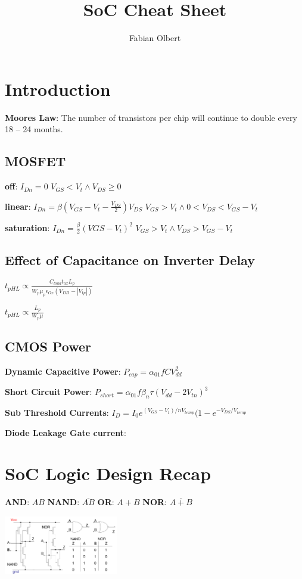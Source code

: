 \documentclass[english]{latex4ei/latex4ei_sheet}
\title{SoC Cheat Sheet}
\author{Fabian Olbert}					%
\begin{document}
\maketitle	%

\section{Introduction}

\textbf{Moores Law}: The number of transistors per chip will continue to double every 18 – 24 months.

\subsection{MOSFET}
\textbf{off}: \qquad $I_{Dn} = 0$ \qquad $V_{GS} < V_t \wedge V_{DS} \geq 0$

\textbf{linear}: \qquad $I_{Dn} = \beta (V_{GS} - V_t - \frac{V_{DS}}{2})V_{DS} $ \qquad $V_{GS} > V_t \wedge  0 < V_{DS} < V_{GS} - V_t$

\textbf{saturation}: \qquad $I_{Dn} = \frac{\beta}{2} (V{GS} - V_t)^2$ \qquad $V_{GS} > V_t \wedge  V_{DS} > V_{GS} - V_t$

\subsection{Effect of Capacitance on Inverter Delay}
$t_{pHL} \varpropto \frac{C_{load} t_{ox} L_p}{W_p \mu_p \epsilon_{Ox} (V_{DD} - |V_{tp}|)}$

$t_{pHL} \varpropto \frac{L_p}{W_p \mu}$

\subsection{CMOS Power}
\textbf{Dynamic Capacitive Power}: $P_{cap} = \alpha_{01} f C V_{dd}^2$

\textbf{Short Circuit Power}: $P_{short} = \alpha_{01} f \beta_n \tau (V_{dd} - 2 V_{tn})^3$

\textbf{Sub Threshold Currents}: $I_D = I_0 e^{(V_{GS} - V_t) / n V_{temp}} (1 - e^{-V_{DS} / V_{temp}}$

\textbf{Diode Leakage Gate current}:



\section{SoC Logic Design Recap}
\textbf{AND}: $A B$
\textbf{NAND}: $\overline{A B}$
\textbf{OR}: $A + B$
\textbf{NOR}: $\overline{A + B}$
\begin{center}
	\includegraphics[width = 5cm ]{images/2. SoC Logic Design Recap/NandNor.png}
\end{center}
\end{document}
